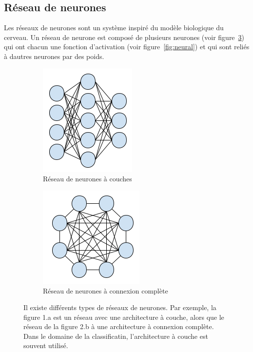 \documentclass[11pt]{sdm}
\begin{document}
	\subsection{R\'eseau de neurones}
		Les r\'eseaux de neurones sont un syst\`eme inspir\'e du mod\`ele biologique du cerveau. Un r\'eseau de neurone est compos\'e de plusieurs neurones (voir figure~\ref{fig:neuralNetwork}) qui ont chacun une fonction d’activation (voir figure~\ref{fig:neural}) et qui sont reli\'es \`a d\textquotesingle autres neurones par des poids.

		\bigbreak

		\begin{figure}[!ht]
			\centering
			\begin{subfigure}{0.45\textwidth}
				\centering	
				\includegraphics[scale=0.7,natwidth=183,natheight=213]{figures/neuralNetworkLayers.png}
				\caption{R\'eseau de neurones \`a couches}
				\label{fig:nnl}
			\end{subfigure}
			\hspace*{\fill}
			\begin{subfigure}{0.45\textwidth}	
				\centering
				\includegraphics[scale=0.7,natwidth=198,natheight=192]{figures/neuralNetworkCompleteConnexion.png}
				\caption{R\'eseau de neurones \`a connexion compl\`ete}
				\label{fig:nnc}
			\end{subfigure}
			\caption{Il existe diff\'erents types de r\'eseaux de neurones. Par exemple, la figure 1.a est un r\'eseau avec une architecture \`a couche, alors que le r\'eseau de la figure 2.b \`a une architecture \`a connexion compl\`ete. Dans le domaine de la classificatin, l'architecture \`a couche est souvent utilis\'e.}
			\label{fig:neuralNetwork}
		\end{figure}
\end{document}
